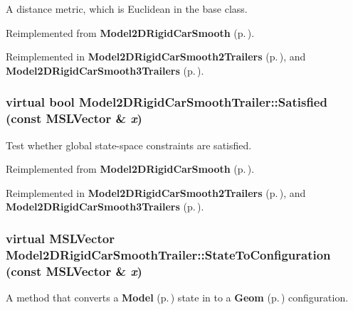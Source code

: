 A distance metric, which is Euclidean in the base class.



Reimplemented from {\bf Model2DRigid\-Car\-Smooth} {\rm (p.\,\pageref{class_Model2DRigidCarSmooth_a4})}.

Reimplemented in {\bf Model2DRigid\-Car\-Smooth2Trailers} {\rm (p.\,\pageref{class_Model2DRigidCarSmooth2Trailers_a3})}, and {\bf Model2DRigid\-Car\-Smooth3Trailers} {\rm (p.\,\pageref{class_Model2DRigidCarSmooth3Trailers_a3})}.
\subsubsection{\setlength{\rightskip}{0pt plus 5cm}virtual bool Model2DRigid\-Car\-Smooth\-Trailer::Satisfied (const {\bf MSLVector} \& {\em x})\hspace{0.3cm}{\tt  [virtual]}}\label{class_Model2DRigidCarSmoothTrailer_a5}


Test whether global state-space constraints are satisfied.



Reimplemented from {\bf Model2DRigid\-Car\-Smooth} {\rm (p.\,\pageref{class_Model2DRigidCarSmooth_a6})}.

Reimplemented in {\bf Model2DRigid\-Car\-Smooth2Trailers} {\rm (p.\,\pageref{class_Model2DRigidCarSmooth2Trailers_a5})}, and {\bf Model2DRigid\-Car\-Smooth3Trailers} {\rm (p.\,\pageref{class_Model2DRigidCarSmooth3Trailers_a5})}.
\subsubsection{\setlength{\rightskip}{0pt plus 5cm}virtual {\bf MSLVector} Model2DRigid\-Car\-Smooth\-Trailer::State\-To\-Configuration (const {\bf MSLVector} \& {\em x})\hspace{0.3cm}{\tt  [virtual]}}\label{class_Model2DRigidCarSmoothTrailer_a4}


A method that converts a {\bf Model} {\rm (p.\,\pageref{class_Model})} state in to a {\bf Geom} {\rm (p.\,\pageref{class_Geom})} configuration.



